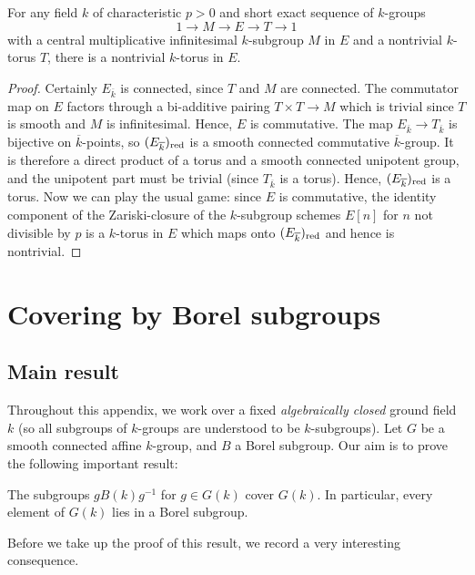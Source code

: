\documentclass[10pt]{article}
\renewcommand{\(}{\left(}
\renewcommand{\)}{\right)}
\numberwithin{thm}{subsection}
\begin{document}
\begin{lemma}
For any field $k$ of characteristic $p > 0$ and short exact sequence of $k$-groups 
$$1 \rightarrow M \rightarrow E \rightarrow T \rightarrow 1$$
with a central multiplicative infinitesimal $k$-subgroup $M$ in $E$ 
and a nontrivial $k$-torus $T$, there is a nontrivial $k$-torus in $E$.
\end{lemma}

\begin{proof}
Certainly $E_{\overline{k}}$ is connected, since $T$ and $M$ are connected.
The commutator map on $E$ factors through a bi-additive pairing
$T \times T \rightarrow M$ which is trivial
since $T$ is smooth and $M$ is infinitesimal. 
Hence, $E$ is commutative.  The map $E_{\overline{k}} \rightarrow T_{\overline{k}}$ is
bijective on $\overline{k}$-points, so
$(E_{\overline{k}})_{\rm{red}}$ is a smooth connected
commutative $\overline{k}$-group.  It is therefore a direct product
of a torus and a smooth connected unipotent group, and the unipotent part
must be trivial (since $T_{\overline{k}}$ is a torus).  Hence,
$(E_{\overline{k}})_{\rm{red}}$ is a torus. 
Now we can play the usual game:  since $E$ is commutative,
the identity component of the Zariski-closure of the $k$-subgroup schemes
$E[n]$ for $n$ not divisible by $p$ is a $k$-torus in $E$ which maps
onto $(E_{\overline{k}})_{\rm{red}}$ and hence is nontrivial. 
\end{proof}

\section{Covering by Borel subgroups}\label{borelapp}


\subsection{Main result}
Throughout this appendix, we work over a fixed {\em algebraically closed} 
ground field $k$ (so all subgroups of $k$-groups are understood
to be $k$-subgroups).   Let $G$ be a smooth connected affine $k$-group,
and $B$ a Borel subgroup.  Our aim is to prove the following important result:

\begin{thm}\label{borel} The subgroups $gB(k)g^{-1}$ for $g \in G(k)$ cover $G(k)$.
In particular, every element of $G(k)$ lies in a Borel subgroup.
\end{thm}

Before we take up the proof of this result, we record a very interesting consequence. 
\end{document}
